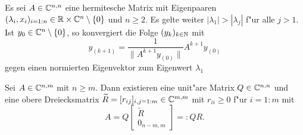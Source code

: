\newpage

\begin{thm}[Potenzmethode]\label{thm:appTheorems:Potenzmethode} Es sei $A\in\mathbb{C}^{n,n}$ eine hermitesche Matrix mit Eigenpaaren $(\lambda_i,x_i)_{i=1:n} \in \mathbb{R}\times\mathbb{C}^n \setminus\{0\}$ und $n\ge 2$.
Es gelte weiter $|\lambda_1| > |\lambda_j|$ f"ur alle
$j > 1$. Ist $y_0 \in\mathbb{C}^n \setminus\{0\}$, so konvergiert die Folge
$(y_k)_{k\in\mathbb{N}}$ mit
\[
y_{(k+1)} = \frac{1}{\|A^{k+1} y_{(0)}\|} A^{k+1}y_{(0)}
\]
gegen einen normierten Eigenvektor zum Eigenwert $\lambda_1$
\end{thm}

\begin{thm}[QR-Zerlegung]\label{thm:appTheorems:QR}
Sei $A\in\mathbb{C}^{n,m}$ mit $n\ge m$. Dann existieren eine unit"are Matrix $Q\in\mathbb{C}^{n,n}$ und eine obere Dreiecksmatrix $\widetilde{R} = [r_{ij}]_{i,j=1:m}\in\mathbb{C}^{m,m}$ mit $r_{ii}\ge 0$ f"ur $i=1:m$ mit
\[
A = Q\begin{bmatrix} \widetilde{R} \\ 0_{n-m,m} \end{bmatrix} =: QR.
\]
\end{thm}
